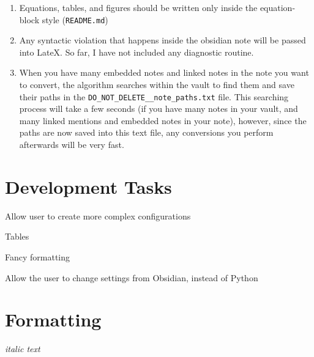 \documentclass{extarticle}
\def\oldbibitem{} \let\oldbibitem=\\bibitem
\def\\bibitem{\stepcounter{citnum}\oldbibitem}
\begin{document}
\author{Marios Gkionis}





\begin{enumerate}
\item Equations, tables, and figures should be written only inside the equation-block style (\texttt{README.md})
\item Any syntactic violation that happens inside the obsidian note will be passed into LateX. So far, I have not included any diagnostic routine.
\item When you have many embedded notes and linked notes in the note you want to convert, the algorithm searches within the vault to find them and save their paths in the \texttt{DO\_NOT\_DELETE\_\_note\_paths.txt} file. This searching process will take a few seconds (if you have many notes in your vault, and many linked mentions and embedded notes in your note), however, since the paths are now saved into this text file, any conversions you perform afterwards will be very fast.
\end{enumerate}





\section{Development Tasks}


\begin{todolist}
\item Allow user to create more complex configurations
\item Tables
\begin{todolist}
\item Fancy formatting
\end{todolist}
\item Allow the user to change settings from Obsidian, instead of Python
\end{todolist}



\section{Formatting}




\textit{italic text}
\end{document}
